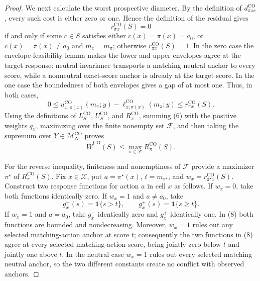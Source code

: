 \documentclass{article}
\begin{document}
\begin{proof}
We next calculate the worst prospective diameter.  By the definition of \(d^{\mathrm{CO}}_{\pi xc}\), every such cost is either zero or one.  Hence the definition of the residual gives
\[
r^{\mathrm{CO}}_{\pi x}(S)=0
\]
if and only if some \(c\in S\) satisfies either \(c(x)=\pi(x)=a_0\), or \(c(x)=\pi(x)\neq a_0\) and \(m_c=m_\pi\); otherwise \(r^{\mathrm{CO}}_{\pi x}(S)=1\).  In the zero case the envelope-feasibility lemma makes the lower and upper envelopes agree at the target response: neutral invariance transports a matching neutral anchor to every score, while a nonneutral exact-score anchor is already at the target score.  In the one case the boundedness of both envelopes gives a gap of at most one.  Thus, in both cases,
\[
0\leq
u^{\mathrm{CO}}_{x,\pi(x)}(m_\pi;y)
-\ell^{\mathrm{CO}}_{x,\pi(x)}(m_\pi;y)
\leq r^{\mathrm{CO}}_{\pi x}(S).
\tag{6}
\]
Using the definitions of \(L^{\mathrm{CO}}_S\), \(U^{\mathrm{CO}}_S\), and \(R^{\mathrm{CO}}_\pi\), summing (6) with the positive weights \(q_x\), maximizing over the finite nonempty set \(\mathcal F\), and then taking the supremum over \(Y\in\mathcal M_N^{\mathrm{CO}}\) proves
\[
\overline W^{\mathrm{CO}}(S)
\leq \max_{\pi\in\mathcal F}R^{\mathrm{CO}}_\pi(S).
\tag{7}
\]

For the reverse inequality, finiteness and nonemptiness of \(\mathcal F\) provide a maximizer \(\pi^\star\) of \(R^{\mathrm{CO}}_\pi(S)\).  Fix \(x\in\mathcal X\), put \(a=\pi^\star(x)\), \(t=m_{\pi^\star}\), and \(w_x=r^{\mathrm{CO}}_{\pi^\star x}(S)\).  Construct two response functions for action \(a\) in cell \(x\) as follows.  If \(w_x=0\), take both functions identically zero.  If \(w_x=1\) and \(a\neq a_0\), take
\[
g_x^-(s)=\mathbf 1\{s>t\},
\qquad
g_x^+(s)=\mathbf 1\{s\geq t\}.
\tag{8}
\]
If \(w_x=1\) and \(a=a_0\), take \(g_x^-\) identically zero and \(g_x^+\) identically one.  In (8) both functions are bounded and nondecreasing.  Moreover, \(w_x=1\) rules out any selected matching-action anchor at score \(t\); consequently the two functions in (8) agree at every selected matching-action score, being jointly zero below \(t\) and jointly one above \(t\).  In the neutral case \(w_x=1\) rules out every selected matching neutral anchor, so the two different constants create no conflict with observed anchors.


\end{proof}
\end{document}
